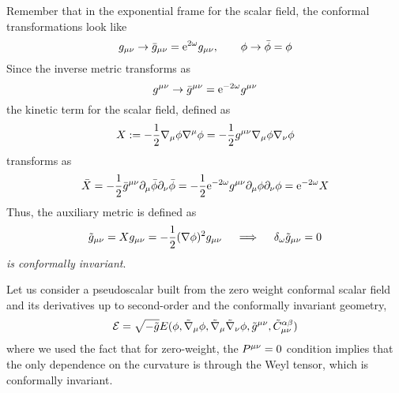 Remember that in the exponential frame for the scalar field, the conformal transformations look like
\begin{equation}
  g_{\mu\nu }\to \bar{g}_{\mu\nu }= \mathrm{e}^{2\omega}g_{\mu\nu },\qquad \phi\to \bar{\phi }=\phi 
\end{equation}
Since the inverse metric transforms as
\begin{equation}
  g^{\mu\nu }\to \bar{g}^{\mu\nu }=\mathrm{e}^{-2\omega}g^{\mu\nu }
\end{equation}
the kinetic term for the scalar field, defined as
\begin{equation}
  X:=-\frac{1}{2}\nabla_\mu \phi \nabla^\mu \phi =-\frac{1}{2}g^{\mu\nu }\nabla_\mu \phi\nabla_\nu \phi 
\end{equation}
transforms as
\begin{equation}
  \bar{X}=-\frac{1}{2}\bar{g}^{\mu\nu }\partial_\mu \bar{\phi }\partial_\nu \bar{\phi }=-\frac{1}{2}\mathrm{e}^{-2\omega}g^{\mu\nu }\partial_\mu \phi\partial_\nu \phi =\mathrm{e}^{-2\omega}X
\end{equation}
Thus, the auxiliary metric is defined as
\begin{equation}
  \tilde{g}_{\mu\nu }=Xg_{\mu\nu }=-\frac{1}{2}(\nabla\phi )^2g_{\mu\nu } \quad \implies\quad \delta_\omega\tilde{g}_{\mu\nu }=0
\end{equation}
\textit{is conformally invariant}.

Let us consider a pseudoscalar built from the zero weight conformal scalar field and its derivatives up to second-order and the conformally invariant geometry,
\begin{equation}
  \mathcal{E}=\sqrt{-\tilde{g}}E(\phi,\tilde{\nabla}_\mu\phi ,\tilde{\nabla}_\mu\tilde{\nabla}_\nu \phi ,\tilde{g}^{\mu\nu },\tilde{C}_{\mu\nu }^{\alpha\beta })
\end{equation}
where we used the fact that for zero-weight, the $P^{\mu\nu }=0$ condition implies that the only dependence on the curvature is through the Weyl tensor, which is conformally invariant.

